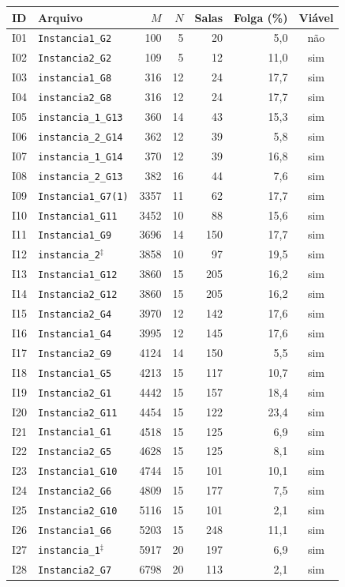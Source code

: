 \begin{tabular}{llrrrrc}
\hline
ID & Arquivo & $M$ & $N$ & Salas & Folga (\%) & Viável \\
\hline
I01 & \texttt{Instancia1\_G2} & 100 & 5 & 20 & 5,0 & não \\
I02 & \texttt{Instancia2\_G2} & 109 & 5 & 12 & 11,0 & sim \\
I03 & \texttt{instancia1\_G8} & 316 & 12 & 24 & 17,7 & sim \\
I04 & \texttt{instancia2\_G8} & 316 & 12 & 24 & 17,7 & sim \\
I05 & \texttt{instancia\_1\_G13} & 360 & 14 & 43 & 15,3 & sim \\
I06 & \texttt{instancia\_2\_G14} & 362 & 12 & 39 & 5,8 & sim \\
I07 & \texttt{instancia\_1\_G14} & 370 & 12 & 39 & 16,8 & sim \\
I08 & \texttt{instancia\_2\_G13} & 382 & 16 & 44 & 7,6 & sim \\
I09 & \texttt{Instancia1\_G7(1)} & 3357 & 11 & 62 & 17,7 & sim \\
I10 & \texttt{Instancia1\_G11} & 3452 & 10 & 88 & 15,6 & sim \\
I11 & \texttt{Instancia1\_G9} & 3696 & 14 & 150 & 17,7 & sim \\
I12 & \texttt{instancia\_2}$^\ddagger$ & 3858 & 10 & 97 & 19,5 & sim \\
I13 & \texttt{Instancia1\_G12} & 3860 & 15 & 205 & 16,2 & sim \\
I14 & \texttt{Instancia2\_G12} & 3860 & 15 & 205 & 16,2 & sim \\
I15 & \texttt{Instancia2\_G4} & 3970 & 12 & 142 & 17,6 & sim \\
I16 & \texttt{Instancia1\_G4} & 3995 & 12 & 145 & 17,6 & sim \\
I17 & \texttt{Instancia2\_G9} & 4124 & 14 & 150 & 5,5 & sim \\
I18 & \texttt{Instancia1\_G5} & 4213 & 15 & 117 & 10,7 & sim \\
I19 & \texttt{Instancia2\_G1} & 4442 & 15 & 157 & 18,4 & sim \\
I20 & \texttt{Instancia2\_G11} & 4454 & 15 & 122 & 23,4 & sim \\
I21 & \texttt{Instancia1\_G1} & 4518 & 15 & 125 & 6,9 & sim \\
I22 & \texttt{Instancia2\_G5} & 4628 & 15 & 125 & 8,1 & sim \\
I23 & \texttt{Instancia1\_G10} & 4744 & 15 & 101 & 10,1 & sim \\
I24 & \texttt{Instancia2\_G6} & 4809 & 15 & 177 & 7,5 & sim \\
I25 & \texttt{Instancia2\_G10} & 5116 & 15 & 101 & 2,1 & sim \\
I26 & \texttt{Instancia1\_G6} & 5203 & 15 & 248 & 11,1 & sim \\
I27 & \texttt{instancia\_1}$^\ddagger$ & 5917 & 20 & 197 & 6,9 & sim \\
I28 & \texttt{Instancia2\_G7} & 6798 & 20 & 113 & 2,1 & sim \\
\hline
\end{tabular}
